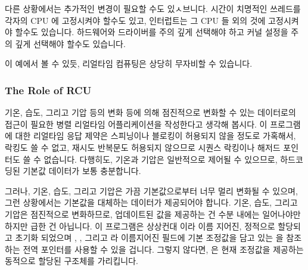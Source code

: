 다른 상황에서는 추가적인 변경이 필요할 수도 있ㅅ브니다.
시간이 치명적인 쓰레드를 각자의 CPU 에 고정시켜야 할수도 있고, 인터럽트는 그
CPU 들 외의 것에 고정시켜야 할수도 있습니다.
하드웨어와 드라이버를 주의 깊게 선택해야 하고 커널 설정을 주의 깊게 선택해야
할수도 있습니다.

이 예에서 볼 수 있듯, 리얼타임 컴퓨팅은 상당히 무자비할 수 있습니다.

\subsubsection{The Role of RCU}
\label{sec:advsync:The Role of RCU}

기온, 습도, 그리고 기압 등의 변화 등에 의해 점진적으로 변화할 수 있는
데이터로의 접근이 필요한 병렬 리얼타임 어플리케이션을 작성한다고 생각해 봅시다.
이 프로그램에 대한 리얼타임 응답 제약은 스피닝이나 블로킹이 허용되지 않을
정도로 가혹해서, 락킹도 쓸 수 없고, 재시도 반복문도 허용되지 않으므로 시퀀스
락킹이나 해저드 포인터도 쓸 수 없습니다.
다행히도, 기온과 기압은 일반적으로 제어될 수 있으므로, 하드코딩된 기본값
데이터가 보통 충분합니다.

그러나, 기온, 습도, 그리고 기압은 가끔 기본값으로부터 너무 멀리 변화될 수
있으며, 그런 상황에서는 기본값을 대체하는 데이터가 제공되어야 합니다.
기온, 습도, 그리고 기압은 점진적으로 변화하므로, 업데이트된 값을 제공하는 건
수분 내에는 일어나야만 하지만 급한 건 아닙니다.
이 프로그램은 상상컨대  이라 이름 지어진, 정적으로 할당되고 초기화
되었으며 , , 그리고  라 이름지어진 필드에 기본 조정값을 담고
있는  을 참조하는 전역 포인터를 사용할 수 있을 겁니다.
그렇지 않다면,  은 현재 조정값을 제공하는 동적으로 할당된 구조체를
가리킵니다.

